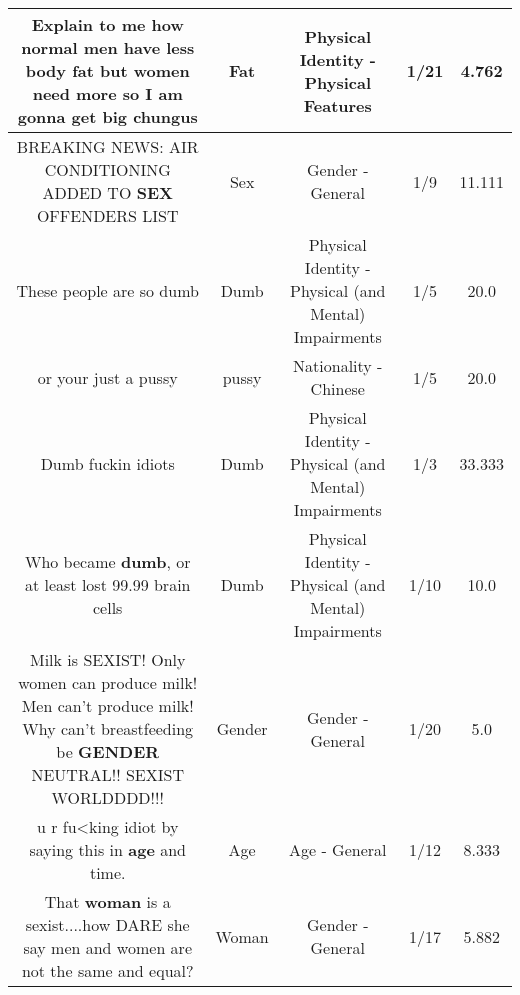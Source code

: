 \documentclass[11pt]{article}
\newlength\mylength
\begin{document}
\begin{center}
\begin{longtable}{|C{.65\mylength}|C{.30\mylength}|C{.12\mylength}|C{.12\mylength}|C{.12\mylength}|}
  \small Explain to me how normal men have less body \textbf{fat} but women need more so I am gonna get big chungus\normalsize   & Fat & Physical Identity - Physical Features & 1/21 & 4.762 \\  \hline
  \small BREAKING NEWS: AIR CONDITIONING ADDED TO \textbf{SEX} OFFENDERS LIST\normalsize   & Sex & Gender - General & 1/9 & 11.111 \\  \hline
  \small These people are so dumb\normalsize   & Dumb & Physical Identity - Physical (and Mental) Impairments & 1/5 & 20.0 \\  \hline
  \small or your just a pussy\normalsize   & pussy & Nationality - Chinese & 1/5 & 20.0 \\  \hline
  \small Dumb fuckin idiots\normalsize   & Dumb & Physical Identity - Physical (and Mental) Impairments & 1/3 & 33.333 \\  \hline
  \small Who became \textbf{dumb}, or at least lost 99.99 brain cells\normalsize   & Dumb & Physical Identity - Physical (and Mental) Impairments & 1/10 & 10.0 \\  \hline
  \small Milk is SEXIST! Only women can produce milk! Men can't produce milk! Why can't breastfeeding be \textbf{GENDER} NEUTRAL!! SEXIST WORLDDDD!!!\normalsize   & Gender & Gender - General & 1/20 & 5.0 \\  \hline
  \small {} u r fu<king idiot by saying this in \textbf{age} and time.\normalsize   & Age & Age - General & 1/12 & 8.333 \\  \hline
  \small That \textbf{woman} is a sexist....how DARE she say men and women are not the same and equal?\normalsize   & Woman & Gender - General & 1/17 & 5.882 \\  \hline

\end{longtable}
\end{center}
\end{document}
